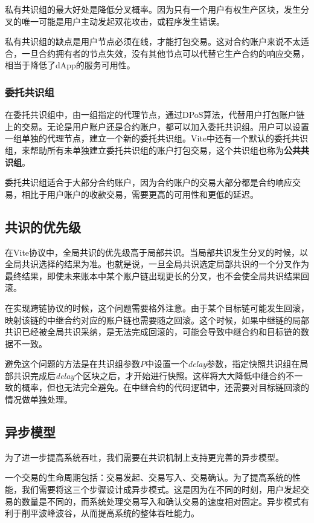 \documentclass[UTF8,nofonts]{ctexart}
\begin{document}
\begin{multicols}{2}
私有共识组的最大好处是降低分叉概率。因为只有一个用户有权生产区块，发生分叉的唯一可能是用户主动发起双花攻击，或程序发生错误。

私有共识组的缺点是用户节点必须在线，才能打包交易。这对合约账户来说不太适合，一旦合约拥有者的节点失效，没有其他节点可以代替它生产合约的响应交易，相当于降低了dApp的服务可用性。

\subsubsection{委托共识组}
在委托共识组中，由一组指定的代理节点，通过DPoS算法，代替用户打包账户链上的交易。无论是用户账户还是合约账户，都可以加入委托共识组。用户可以设置一组单独的代理节点，建立一个新的委托共识组。Vite中还有一个默认的委托共识组，来帮助所有未单独建立委托共识组的账户打包交易，这个共识组也称为\textbf{公共共识组}。

委托共识组适合于大部分合约账户，因为合约账户的交易大部分都是合约响应交易，相比于用户账户的收款交易，需要更高的可用性和更低的延迟。

\subsection{共识的优先级}\label{sec:consensus-prio}
在Vite协议中，全局共识的优先级高于局部共识。当局部共识发生分叉的时候，以全局共识选择的结果为准。也就是说，一旦全局共识选定局部共识的一个分叉作为最终结果，即使未来账本中某个账户链出现更长的分叉，也不会使全局共识结果回滚。

在实现跨链协议的时候，这个问题需要格外注意。由于某个目标链可能发生回滚，映射该链的中继合约对应的账户链也需要随之回滚。这个时候，如果中继链的局部共识已经被全局共识采纳，是无法完成回滚的，可能会导致中继合约和目标链的数据不一致。

避免这个问题的方法是在共识组参数$P$中设置一个\textit{delay}参数，指定快照共识组在局部共识完成后\textit{delay}个区块之后，才开始进行快照。这样将大大降低中继合约不一致的概率，但也无法完全避免。在中继合约的代码逻辑中，还需要对目标链回滚的情况做单独处理。

\subsection{异步模型}
为了进一步提高系统吞吐，我们需要在共识机制上支持更完善的异步模型。

一个交易的生命周期包括：交易发起、交易写入、交易确认。为了提高系统的性能，我们需要将这三个步骤设计成异步模式。这是因为在不同的时刻，用户发起交易的数量是不同的，而系统处理交易写入和确认交易的速度相对固定。异步模式有利于削平波峰波谷，从而提高系统的整体吞吐能力。


\end{multicols}
\end{document}

